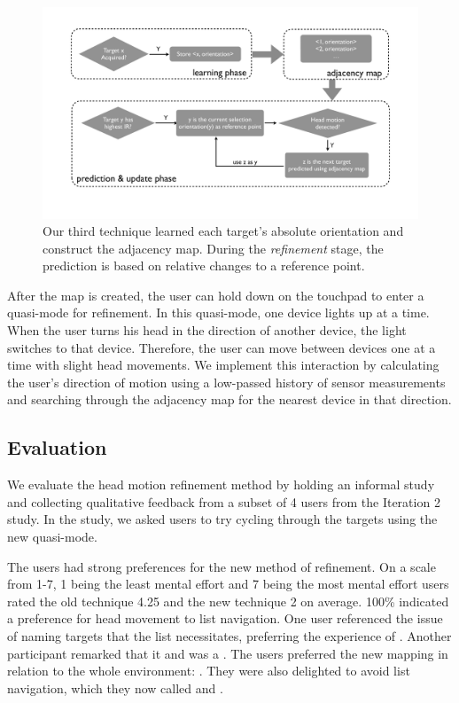 \begin{figure}[t]
\centering
\includegraphics[width=1\columnwidth]{figures/third_technique.pdf}
\caption{Our third technique learned each target's absolute orientation and
construct the adjacency map. During the {\em refinement} stage, the prediction
is based on relative changes to a reference point.}
\label{fig:third_technique}
\end{figure}

After the map is created, the user can hold down on the touchpad to enter a
quasi-mode for refinement. In this quasi-mode, one device lights up at a time.
When the user turns his head in the direction of another device, the light
switches to that device. Therefore, the user can move between devices one at a
time with slight head movements. We implement this interaction by calculating
the user's direction of motion using a low-passed history of sensor
measurements and searching through the adjacency map for the nearest device in
that direction.

\subsection{Evaluation}
We evaluate the head motion refinement method by holding an informal study and
collecting qualitative feedback from a subset of 4 users from the Iteration 2
study. In the study, we asked users to try cycling through the targets using
the new quasi-mode.

The users had strong preferences for the new method of refinement. On a scale
from 1-7, 1 being the least mental effort and 7 being the most mental effort
users rated the old technique 4.25 and the new technique 2 on average. 100\%
indicated a preference for head movement to list navigation. One user
referenced the issue of naming targets that the list necessitates, preferring
the experience of .
Another participant remarked that it  and was
a . The users
preferred the new mapping in relation to the whole environment: . They
were also delighted to avoid list navigation, which they now called
 and .
